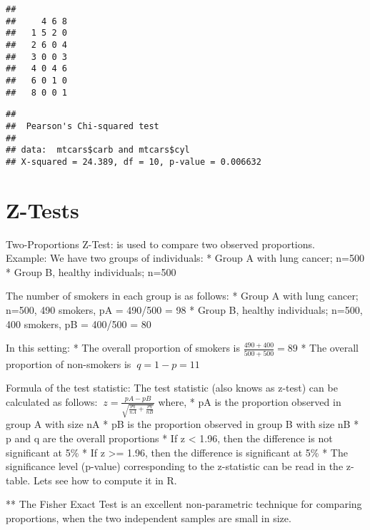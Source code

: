 \documentclass[
]{article}
\newenvironment{Shaded}{\begin{snugshade}}{\end{snugshade}}
\newcommand{\KeywordTok}[1]{\textcolor[rgb]{0.13,0.29,0.53}{\textbf{#1}}}
\newcommand{\NormalTok}[1]{#1}
\newcommand{\OperatorTok}[1]{\textcolor[rgb]{0.81,0.36,0.00}{\textbf{#1}}}
\begin{document}
\begin{verbatim}
##    
##     4 6 8
##   1 5 2 0
##   2 6 0 4
##   3 0 0 3
##   4 0 4 6
##   6 0 1 0
##   8 0 0 1
\end{verbatim}

\begin{Shaded}
\end{Shaded}

\begin{verbatim}
## 
##  Pearson's Chi-squared test
## 
## data:  mtcars$carb and mtcars$cyl
## X-squared = 24.389, df = 10, p-value = 0.006632
\end{verbatim}

\hypertarget{z-tests}{%
\section{Z-Tests}\label{z-tests}}

Two-Proportions Z-Test: is used to compare two observed proportions.\\
Example: We have two groups of individuals: * Group A with lung cancer;
n=500 * Group B, healthy individuals; n=500

The number of smokers in each group is as follows: * Group A with lung
cancer; n=500, 490 smokers, pA = 490/500 = 98 * Group B, healthy
individuals; n=500, 400 smokers, pB = 400/500 = 80

In this setting: * The overall proportion of smokers is
\(\frac{490+400}{500+500}=89\) * The overall proportion of non-smokers
is \(\ q=1-p=11\)

Formula of the test statistic: The test statistic (also knows as z-test)
can be calculated as follows:
\(\ z= \frac{pA-pB}{\sqrt{\frac{pq}{nA}+\frac{pq}{nB}}}\) where, * pA is
the proportion observed in group A with size nA * pB is the proportion
observed in group B with size nB * p and q are the overall proportions *
If \textbar z\textbar{} \textless{} 1.96, then the difference is not
significant at 5\% * If \textbar z\textbar{} \textgreater= 1.96, then
the difference is significant at 5\% * The significance level (p-value)
corresponding to the z-statistic can be read in the z-table. Lets see
how to compute it in R.

** The Fisher Exact Test is an excellent non-parametric technique for
comparing proportions, when the two independent samples are small in
size.
\end{document}
